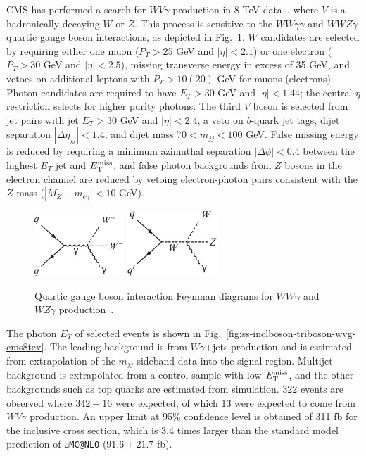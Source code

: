 CMS has performed a search for $WV\gamma$ production in 8 TeV
data~\cite{Chatrchyan:2014bza}, where $V$ is a hadronically decaying
$W$ or $Z$.  This process is sensitive to the $WW\gamma\gamma$ and
$WWZ\gamma$ quartic gauge boson interactions, as depicted in
Fig.~\ref{fig:ss-inclboson-triboson-wvg-diagrams}.  $W$ candidates are
selected by requiring either one muon ($P_T > 25$ GeV and
$|\eta|<2.1$) or one electron ($P_T > 30$ GeV and $|\eta| < 2.5$),
missing transverse energy in excess of 35 GeV, and vetoes on
additional leptons with $P_T > 10 (20)$ GeV for muons (electrons).
Photon candidates are required to have $E_T > 30$ GeV and $|\eta| <
1.44$; the central $\eta$ restriction selects for higher purity
photons.  The third $V$ boson is selected from jet pairs with jet $E_T
> 30$ GeV and $|\eta| < 2.4$, a veto on $b$-quark jet tags, dijet
separation $|\Delta\eta_{jj}| < 1.4$, and dijet mass $70 < m_{jj} <
100$ GeV.  False missing energy is reduced by requiring a minimum
azimuthal separation $|\Delta\phi| < 0.4$ between the highest $E_T$
jet and $E_{\mathrm{T}}^{\mathrm{miss}}$, and false photon backgrounds from $Z$ bosons in the
electron channel are reduced by vetoing electron-photon pairs
consistent with the $Z$ mass ($|M_Z-m_{e\gamma}| < 10$ GeV).

\begin{figure}[p]
    \centering
    \includegraphics[width=0.3\textwidth]{figures/ss-inclboson-triboson-wvg-diagram1.pdf}
    \includegraphics[width=0.3\textwidth]{figures/ss-inclboson-triboson-wvg-diagram2.pdf}
    \caption{Quartic gauge boson interaction Feynman diagrams for $WW\gamma$ and $WZ\gamma$ production~\cite{Chatrchyan:2014bza}.}
    \label{fig:ss-inclboson-triboson-wvg-diagrams}
\end{figure}


The photon $E_T$ of selected events is shown in
Fig.~\ref{fig:ss-inclboson-triboson-wvg-cms8tev}.  The leading
background is from $W\gamma$+jets production and is estimated from
extrapolation of the $m_{jj}$ sideband data into the signal region.
Multijet background is extrapolated from a control sample with low
$E_{\mathrm{T}}^{\mathrm{miss}}$, and the other backgrounds such as top quarks are estimated
from simulation.  322 events are observed where $342\pm 16$ were
expected, of which 13 were expected to come from $WV\gamma$
production.  An upper limit at 95\% confidence level is obtained of
311 fb for the inclusive cross section, which is 3.4 times larger than
the standard model prediction of \texttt{aMC@NLO} ($91.6 \pm 21.7$ fb).

